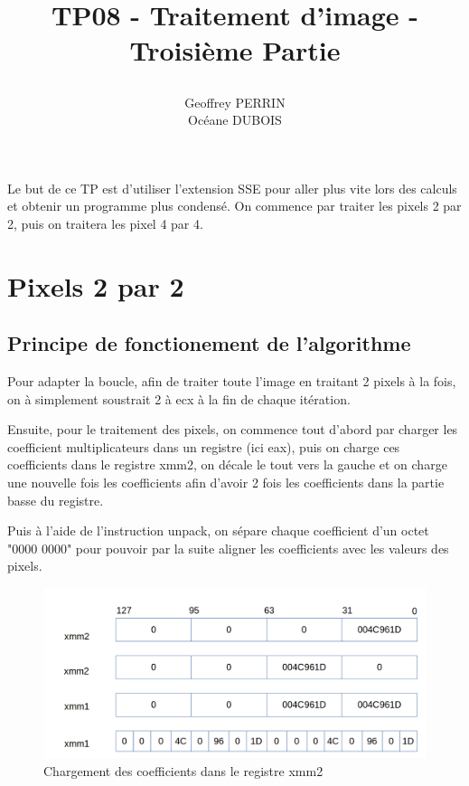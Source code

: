 \documentclass[11pt]{report}
\title{\textbf{TP08 - Traitement d'image - Troisième Partie }
\author{Geoffrey PERRIN \\ Océane DUBOIS\\}
\date{}}
\begin{document}
\maketitle

\newpage

Le but de ce TP est d'utiliser l'extension SSE pour aller plus vite lors des calculs et obtenir un programme plus condensé.
On commence par traiter les pixels 2 par 2, puis on traitera les pixel 4 par 4.

\section{Pixels 2 par 2}
\subsection{Principe de fonctionement de l'algorithme}

Pour adapter la boucle, afin de traiter toute l'image en traitant 2 pixels à la fois, on à simplement soustrait 2 à ecx à la fin de chaque itération. 

Ensuite, pour le traitement des pixels, on commence tout d'abord par charger les coefficient multiplicateurs dans un registre (ici eax), puis on charge ces coefficients dans le registre xmm2, on décale le tout vers la gauche et on charge une nouvelle fois les coefficients afin d'avoir 2 fois les coefficients dans la partie basse du registre.


Puis à l'aide de l'instruction unpack, on sépare chaque coefficient d'un octet "0000 0000" pour pouvoir par la suite aligner les coefficients avec les valeurs des pixels. 

\begin{figure}[htp]
\centering
\includegraphics[scale=0.2]{charge_coeff.png}
\caption{Chargement des coefficients dans le registre xmm2}

\end{figure}
\end{document}
